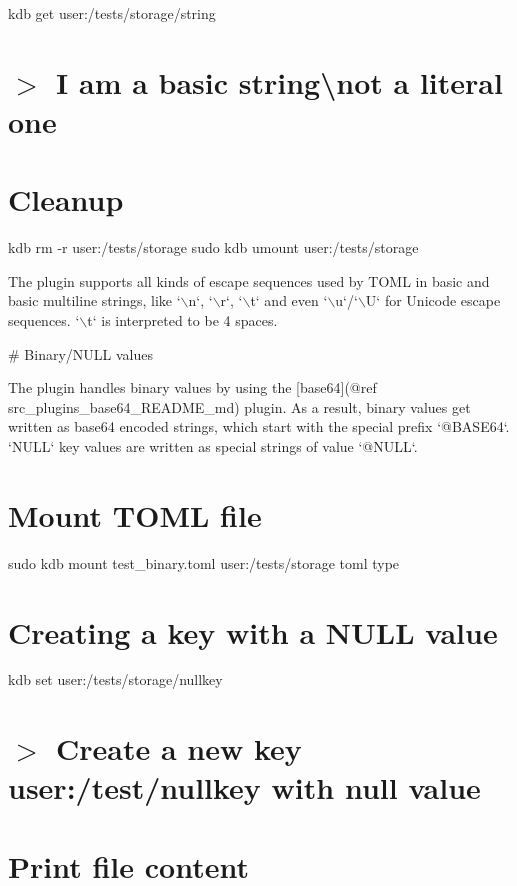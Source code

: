 kdb get \textquotesingle{}user\+:/tests/storage/string\textquotesingle{} \hypertarget{autotoc_md642_autotoc_md695}{}\section{$>$ I am a basic string\textbackslash{}not a literal one}\label{autotoc_md642_autotoc_md695}
\hypertarget{autotoc_md642_autotoc_md696}{}\section{Cleanup}\label{autotoc_md642_autotoc_md696}
kdb rm -\/r user\+:/tests/storage sudo kdb umount user\+:/tests/storage 
\begin{DoxyCode}
The plugin supports all kinds of escape sequences used by TOML in basic and basic multiline strings, like
       `\(\backslash\)n`, `\(\backslash\)r`, `\(\backslash\)t` and
even `\(\backslash\)u`/`\(\backslash\)U` for Unicode escape sequences. `\(\backslash\)t` is interpreted to be 4 spaces.

# Binary/NULL values

The plugin handles binary values by using the [base64](@ref src\_plugins\_base64\_README\_md) plugin.
As a result, binary values get written as base64 encoded strings, which start with the special prefix
       `@BASE64`.
`NULL` key values are written as special strings of value `@NULL`.
\end{DoxyCode}
 \hypertarget{autotoc_md642_autotoc_md697}{}\section{Mount T\+O\+M\+L file}\label{autotoc_md642_autotoc_md697}
sudo kdb mount test\+\_\+binary.\+toml user\+:/tests/storage toml type\hypertarget{autotoc_md642_autotoc_md698}{}\section{Creating a key with a N\+U\+L\+L value}\label{autotoc_md642_autotoc_md698}
kdb set \textquotesingle{}user\+:/tests/storage/nullkey\textquotesingle{} \hypertarget{autotoc_md642_autotoc_md699}{}\section{$>$ Create a new key user\+:/test/nullkey with null value}\label{autotoc_md642_autotoc_md699}
\hypertarget{autotoc_md642_autotoc_md700}{}\section{Print file content}\label{autotoc_md642_autotoc_md700}
